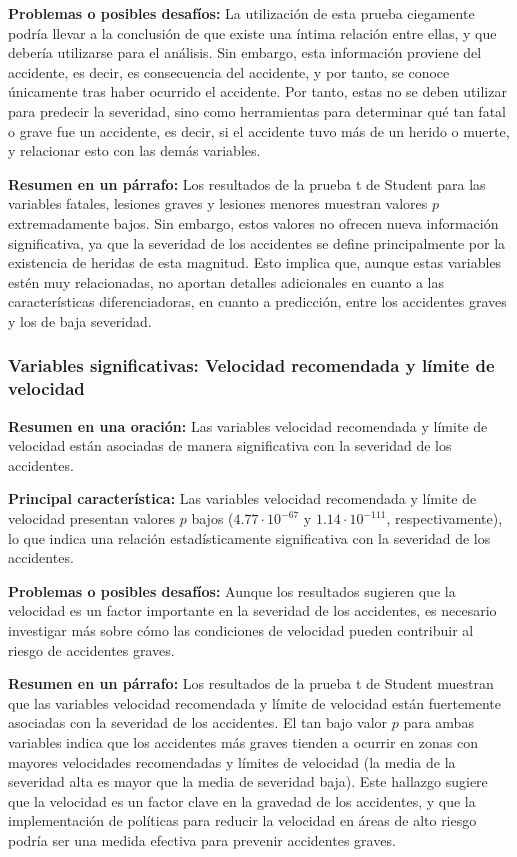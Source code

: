 \documentclass{book}
\begin{document}
\textbf{Problemas o posibles desafíos:} La utilización de esta prueba ciegamente podría llevar a la conclusión de que existe una íntima relación entre ellas, y que debería utilizarse para el análisis. Sin embargo, esta información proviene del accidente, es decir, es consecuencia del accidente, y por tanto, se conoce únicamente tras haber ocurrido el accidente. Por tanto, estas no se deben utilizar para predecir la severidad, sino como herramientas para determinar qué tan fatal o grave fue un accidente, es decir, si el accidente tuvo más de un herido o muerte, y relacionar esto con las demás variables.

\textbf{Resumen en un párrafo:} Los resultados de la prueba t de Student para las variables fatales, lesiones graves y lesiones menores muestran valores $p$ extremadamente bajos. Sin embargo, estos valores no ofrecen nueva información significativa, ya que la severidad de los accidentes se define principalmente por la existencia de heridas de esta magnitud. Esto implica que, aunque estas variables estén muy relacionadas, no aportan detalles adicionales en cuanto a las características diferenciadoras, en cuanto a predicción, entre los accidentes graves y los de baja severidad.

\subsubsection{Variables significativas: Velocidad recomendada y límite de velocidad}
\textbf{Resumen en una oración:} Las variables velocidad recomendada y límite de velocidad están asociadas de manera significativa con la severidad de los accidentes.

\textbf{Principal característica:} Las variables velocidad recomendada y límite de velocidad presentan valores $p$ bajos ($4.77 \cdot 10^{-67}$ y $1.14 \cdot 10^{-111}$, respectivamente), lo que indica una relación estadísticamente significativa con la severidad de los accidentes.

\textbf{Problemas o posibles desafíos:} Aunque los resultados sugieren que la velocidad es un factor importante en la severidad de los accidentes, es necesario investigar más sobre cómo las condiciones de velocidad pueden contribuir al riesgo de accidentes graves.

\textbf{Resumen en un párrafo:} 
Los resultados de la prueba t de Student muestran que las variables velocidad recomendada y límite de velocidad están fuertemente asociadas con la severidad de los accidentes. El tan bajo valor $p$ para ambas variables indica que los accidentes más graves tienden a ocurrir en zonas con mayores velocidades recomendadas y límites de velocidad (la media de la severidad alta es mayor que la media de severidad baja). Este hallazgo sugiere que la velocidad es un factor clave en la gravedad de los accidentes, y que la implementación de políticas para reducir la velocidad en áreas de alto riesgo podría ser una medida efectiva para prevenir accidentes graves.
\end{document}
